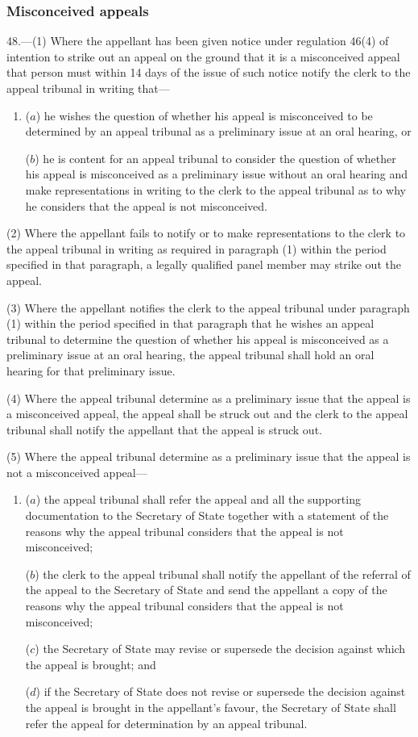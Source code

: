 \documentclass[12pt,a4paper]{article}
\begin{document}
\subsubsection[48. Misconceived appeals]{Misconceived appeals}

48.—(1) Where the appellant has been given notice under regulation 46(4) of intention to strike out an appeal on the ground that it is a misconceived appeal that person must within 14 days of the issue of such notice notify the clerk to the appeal tribunal in writing that—
\begin{enumerate}\item[]
($a$) he wishes the question of whether his appeal is misconceived to be determined by an appeal tribunal as a preliminary issue at an oral hearing, or

($b$) he is content for an appeal tribunal to consider the question of whether his appeal is misconceived as a preliminary issue without an oral hearing and make representations in writing to the clerk to the appeal tribunal as to why he considers that the appeal is not misconceived.
\end{enumerate}

(2) Where the appellant fails to notify or to make representations to the clerk to the appeal tribunal in writing as required in paragraph (1) within the period specified in that paragraph, a legally qualified panel member may strike out the appeal.

(3) Where the appellant notifies the clerk to the appeal tribunal under paragraph (1) within the period specified in that paragraph that he wishes an appeal tribunal to determine the question of whether his appeal is misconceived as a preliminary issue at an oral hearing, the appeal tribunal shall hold an oral hearing for that preliminary issue.

(4) Where the appeal tribunal determine as a preliminary issue that the appeal is a misconceived appeal, the appeal shall be struck out and the clerk to the appeal tribunal shall notify the appellant that the appeal is struck out.

(5) Where the appeal tribunal determine as a preliminary issue that the appeal is not a misconceived appeal—
\begin{enumerate}\item[]
($a$) the appeal tribunal shall refer the appeal and all the supporting documentation to the Secretary of State together with a statement of the reasons why the appeal tribunal considers that the appeal is not misconceived;

($b$) the clerk to the appeal tribunal shall notify the appellant of the referral of the appeal to the Secretary of State and send the appellant a copy of the reasons why the appeal tribunal considers that the appeal is not misconceived;

($c$) the Secretary of State may revise or supersede the decision against which the appeal is brought; and

($d$) if the Secretary of State does not revise or supersede the decision against the appeal is brought in the appellant’s favour, the Secretary of State shall refer the appeal for determination by an appeal tribunal.
\end{enumerate}
\end{document}
